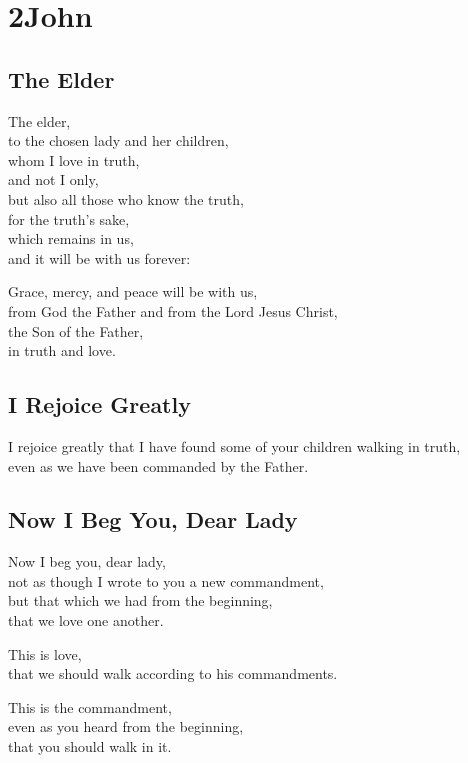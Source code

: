 \chapter{2John}

\newpage\section{The Elder}

The elder,
\\
to the chosen lady and her children,
\\
whom I love in truth,
\\
and not I only,
\\
but also all those who know the truth,
\\
for the truth's sake,
\\
which remains in us,
\\
and it will be with us forever:

Grace, mercy, and peace will be with us,
\\
from God the Father and from the Lord Jesus Christ,
\\
the Son of the Father,
\\
in truth and love.

\newpage\section{I Rejoice Greatly}

I rejoice greatly that I have found some of your children walking in truth,
\\
even as we have been commanded by the Father.

\newpage\section{Now I Beg You, Dear Lady}

Now I beg you, dear lady,
\\
not as though I wrote to you a new commandment,
\\
but that which we had from the beginning,
\\
that we love one another.

This is love,
\\
that we should walk according to his commandments.

This is the commandment,
\\
even as you heard from the beginning,
\\
that you should walk in it.

